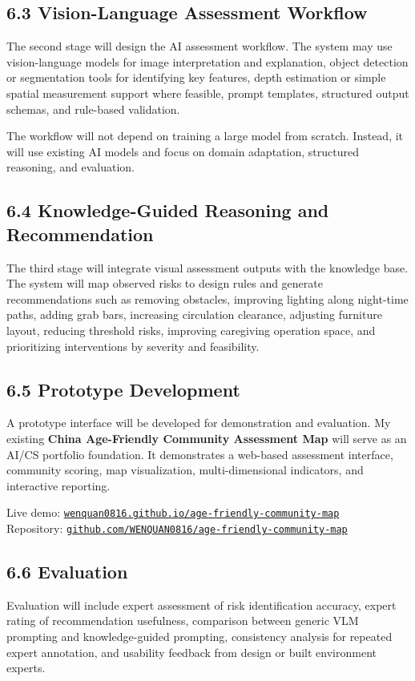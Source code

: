 \documentclass[11pt,a4paper]{article}
\begin{document}
\subsection*{6.3 Vision-Language Assessment Workflow}
The second stage will design the AI assessment workflow. The system may use vision-language models for image interpretation and explanation, object detection or segmentation tools for identifying key features, depth estimation or simple spatial measurement support where feasible, prompt templates, structured output schemas, and rule-based validation.

The workflow will not depend on training a large model from scratch. Instead, it will use existing AI models and focus on domain adaptation, structured reasoning, and evaluation.

\subsection*{6.4 Knowledge-Guided Reasoning and Recommendation}
The third stage will integrate visual assessment outputs with the knowledge base. The system will map observed risks to design rules and generate recommendations such as removing obstacles, improving lighting along night-time paths, adding grab bars, increasing circulation clearance, adjusting furniture layout, reducing threshold risks, improving caregiving operation space, and prioritizing interventions by severity and feasibility.

\subsection*{6.5 Prototype Development}
A prototype interface will be developed for demonstration and evaluation. My existing \textbf{China Age-Friendly Community Assessment Map} will serve as an AI/CS portfolio foundation. It demonstrates a web-based assessment interface, community scoring, map visualization, multi-dimensional indicators, and interactive reporting.

Live demo: \href{https://wenquan0816.github.io/age-friendly-community-map/}{\nolinkurl{wenquan0816.github.io/age-friendly-community-map}}\\
Repository: \href{https://github.com/WENQUAN0816/age-friendly-community-map}{\nolinkurl{github.com/WENQUAN0816/age-friendly-community-map}}

\subsection*{6.6 Evaluation}
Evaluation will include expert assessment of risk identification accuracy, expert rating of recommendation usefulness, comparison between generic VLM prompting and knowledge-guided prompting, consistency analysis for repeated expert annotation, and usability feedback from design or built environment experts.
\end{document}
